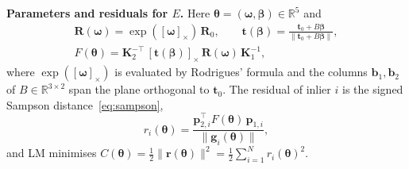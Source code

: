 \documentclass[journal]{IEEEtran}
\newcommand{\R}{\mathbf{R}}
\newcommand{\tv}{\mathbf{t}}
\newcommand{\K}{\mathbf{K}}
\begin{document}
\textbf{Parameters and residuals for $E$.} Here $\boldsymbol\theta=(\boldsymbol\omega,\boldsymbol\beta)\in\mathbb{R}^5$ and
\begin{gather}
  \R(\boldsymbol\omega)=\exp([\boldsymbol\omega]_\times)\,\R_0,\qquad \tv(\boldsymbol\beta)=\frac{\tv_0+B\boldsymbol\beta}{\|\tv_0+B\boldsymbol\beta\|},\\
  F(\boldsymbol\theta)=\K_2^{-\top}\,[\tv(\boldsymbol\beta)]_\times\,\R(\boldsymbol\omega)\,\K_1^{-1},
\end{gather}
where $\exp([\boldsymbol\omega]_\times)$ is evaluated by Rodrigues' formula and the columns $\mathbf{b}_1,\mathbf{b}_2$ of $B\in\mathbb{R}^{3\times2}$ span the plane orthogonal to $\tv_0$. The residual of inlier $i$ is the signed Sampson distance~\eqref{eq:sampson},
\begin{equation}
  r_i(\boldsymbol\theta)=\frac{\mathbf{p}_{2,i}^\top F(\boldsymbol\theta)\,\mathbf{p}_{1,i}}{\|\mathbf{g}_i(\boldsymbol\theta)\|},
\end{equation}
and LM minimises $C(\boldsymbol\theta)=\tfrac12\|\mathbf{r}(\boldsymbol\theta)\|^2=\tfrac12\sum_{i=1}^N r_i(\boldsymbol\theta)^2$.
\end{document}
